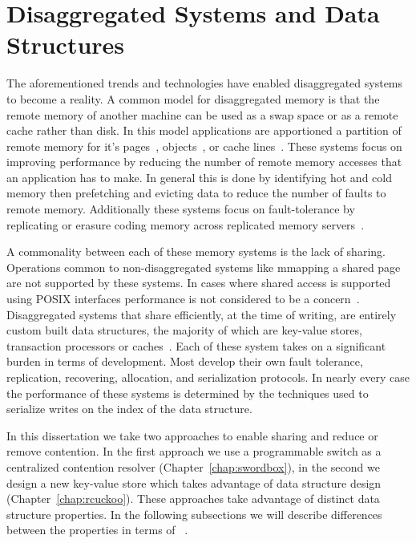 \documentclass[12pt]{ucsddissertation}
\begin{document}
\section{Disaggregated Systems and Data Structures}
\label{sec:disaggregated-data-structures}
The aforementioned trends and technologies have enabled disaggregated systems to become a reality.
A common model for disaggregated memory is that the remote memory of another machine can be used as
a swap space or as a remote cache rather than disk. In this model applications are apportioned a
partition of remote memory for it's pages~\cite{infiniswap,fastswap,leap,blade-server,legoos,hydra},
objects~\cite{aifm,carbink}, or cache lines~\cite{kona}. These systems focus on improving
performance by reducing the number of remote memory accesses that an application has to make. In
general this is done by identifying hot and cold memory then prefetching and evicting data to reduce
the number of faults to remote memory.  Additionally these systems focus on fault-tolerance by
replicating or erasure coding memory across replicated memory servers~\cite{hydra}.

A commonality between each of these memory systems is the lack of sharing. Operations common to
non-disaggregated systems like mmapping a shared page are not supported by these systems. In cases
where shared access is supported using POSIX interfaces performance is not considered to be a
concern~\cite{Regions}. Disaggregated systems that share efficiently, at the time of writing, are
entirely custom built data structures, the majority of which are key-value stores, transaction
processors or caches~\cite{clover, sherman, race, fusee, rolex, ford, ditto}. Each of these system
takes on a significant burden in terms of development. Most develop their own fault tolerance,
replication, recovering, allocation, and serialization protocols. In nearly every case the
performance of these systems is determined by the techniques used to serialize writes on the index
of the data structure.

In this dissertation we take two approaches to enable sharing and reduce or remove contention. In
the first approach we use a programmable switch as a centralized contention resolver
(Chapter~\ref{chap:swordbox}), in the second we design a new key-value store which takes advantage
of data structure design (Chapter~\ref{chap:rcuckoo}). These approaches take advantage of distinct
data structure properties. In the following subsections we will describe differences between the
properties in terms of ~.
\end{document}
